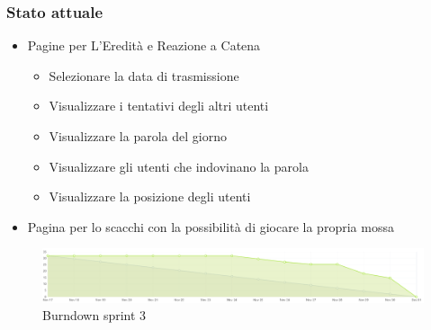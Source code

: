 \documentclass{beamer}
\begin{document}
\begin{frame}
  \frametitle{Stato attuale}
  \begin{itemize}
    \item Pagine per L'Eredità e Reazione a Catena
    \begin{itemize}
      \item  Selezionare la data di trasmissione
      \item  Visualizzare i tentativi degli altri utenti
      \item  Visualizzare la parola del giorno
      \item  Visualizzare gli utenti che indovinano la parola
      \item  Visualizzare la posizione degli utenti
    \end{itemize}
    \item Pagina per lo scacchi con la possibilità di giocare la propria mossa
  \end{itemize}
  \begin{figure}
    \centering
    \includegraphics[width=\textwidth]{./img/burndown.png}
    \caption{Burndown sprint 3}
  \end{figure}
\end{frame}
\end{document}
